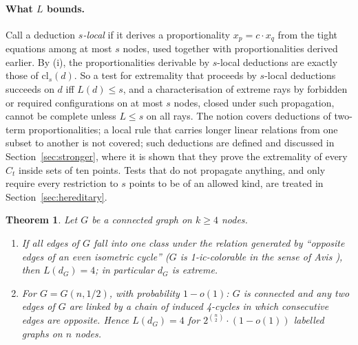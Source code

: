 \documentclass[11pt,a4paper]{article}
\newtheorem{theorem}{Theorem}
\theoremstyle{definition}
\theoremstyle{remark}
\newcommand{\cl}{\mathrm{cl}}
\begin{document}
\paragraph{What $L$ bounds.} Call a deduction \emph{$s$-local} if it derives a proportionality $x_p = c\cdot x_q$
from the tight equations among at most $s$ nodes, used together with proportionalities derived earlier. By (i), the
proportionalities derivable by $s$-local deductions are exactly those of $\cl_s(d)$. So a test for extremality that
proceeds by $s$-local deductions succeeds on $d$ iff $L(d) \le s$, and a characterisation of extreme rays by
forbidden or required configurations on at most $s$ nodes, closed under such propagation, cannot be complete unless
$L \le s$ on all rays. The notion covers deductions of two-term proportionalities; a local rule that carries longer
linear relations from one subset to another is not covered; such deductions are defined and discussed in
Section~\ref{sec:stronger}, where it is shown that they prove the extremality of every $C_t$ inside sets of ten points. Tests that do not
propagate anything, and only require every restriction to $s$ points to be of an allowed kind, are treated in
Section~\ref{sec:hereditary}.

\begin{theorem}\label{thm:four}
Let $G$ be a connected graph on $k \ge 4$ nodes.
\begin{enumerate}[label=\textup{(\alph*)},leftmargin=*]
\item If all edges of $G$ fall into one class under the relation generated by ``opposite edges of an even isometric
  cycle'' ($G$ is 1-ic-colorable in the sense of Avis \cite[\S2]{A80}), then $L(d_G) = 4$; in particular $d_G$ is
  extreme.
\item For $G = G(n, 1/2)$, with probability $1 - o(1)$: $G$ is connected and any two edges of $G$ are linked by a
  chain of induced 4-cycles in which consecutive edges are opposite. Hence $L(d_G) = 4$ for
  $2^{\binom n2}\cdot(1 - o(1))$ labelled graphs on $n$ nodes.
\end{enumerate}
\end{theorem}
\end{document}
